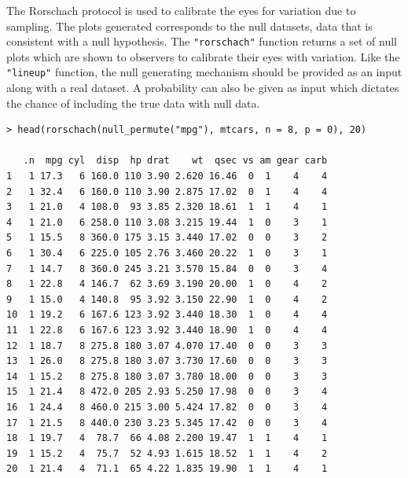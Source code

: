 The Rorschach protocol is used to calibrate the eyes for variation due
to sampling. The plots generated corresponds to the null datasets, data
that is consistent with a null hypothesis. The \texttt{"rorschach"}
function returns a set of null plots which are shown to observers to
calibrate their eyes with variation. Like the \texttt{"lineup"}
function, the null generating mechanism should be provided as an input
along with a real dataset. A probability can also be given as input
which dictates the chance of including the true data with null data.

\begin{verbatim}
> head(rorschach(null_permute("mpg"), mtcars, n = 8, p = 0), 20)

   .n  mpg cyl  disp  hp drat    wt  qsec vs am gear carb
1   1 17.3   6 160.0 110 3.90 2.620 16.46  0  1    4    4
2   1 32.4   6 160.0 110 3.90 2.875 17.02  0  1    4    4
3   1 21.0   4 108.0  93 3.85 2.320 18.61  1  1    4    1
4   1 21.0   6 258.0 110 3.08 3.215 19.44  1  0    3    1
5   1 15.5   8 360.0 175 3.15 3.440 17.02  0  0    3    2
6   1 30.4   6 225.0 105 2.76 3.460 20.22  1  0    3    1
7   1 14.7   8 360.0 245 3.21 3.570 15.84  0  0    3    4
8   1 22.8   4 146.7  62 3.69 3.190 20.00  1  0    4    2
9   1 15.0   4 140.8  95 3.92 3.150 22.90  1  0    4    2
10  1 19.2   6 167.6 123 3.92 3.440 18.30  1  0    4    4
11  1 22.8   6 167.6 123 3.92 3.440 18.90  1  0    4    4
12  1 18.7   8 275.8 180 3.07 4.070 17.40  0  0    3    3
13  1 26.0   8 275.8 180 3.07 3.730 17.60  0  0    3    3
14  1 15.2   8 275.8 180 3.07 3.780 18.00  0  0    3    3
15  1 21.4   8 472.0 205 2.93 5.250 17.98  0  0    3    4
16  1 24.4   8 460.0 215 3.00 5.424 17.82  0  0    3    4
17  1 21.5   8 440.0 230 3.23 5.345 17.42  0  0    3    4
18  1 19.7   4  78.7  66 4.08 2.200 19.47  1  1    4    1
19  1 15.2   4  75.7  52 4.93 1.615 18.52  1  1    4    2
20  1 21.4   4  71.1  65 4.22 1.835 19.90  1  1    4    1
\end{verbatim}

